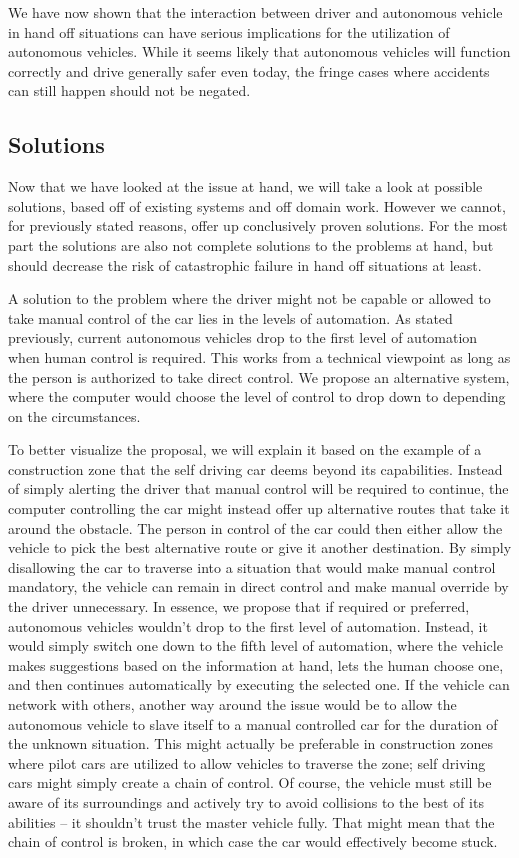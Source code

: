 \documentclass{acm_proc_article-sp}
\begin{document}
We have now shown that the interaction between driver and autonomous vehicle in hand off situations can have serious implications for the utilization of autonomous vehicles.
While it seems likely that autonomous vehicles will function correctly and drive generally safer even today, the fringe cases where accidents can still happen should not be negated.

\subsection{Solutions}
\label{solutions}

Now that we have looked at the issue at hand, we will take a look at possible solutions, based off of existing systems and off domain work.
However we cannot, for previously stated reasons, offer up conclusively proven solutions.
For the most part the solutions are also not complete solutions to the problems at hand, but should decrease the risk of catastrophic failure in hand off situations at least.

A solution to the problem where the driver might not be capable or allowed to take manual control of the car lies in the levels of automation.
As stated previously, current autonomous vehicles drop to the first level of automation when human control is required.
This works from a technical viewpoint as long as the person is authorized to take direct control.
We propose an alternative system, where the computer would choose the level of control to drop down to depending on the circumstances.

To better visualize the proposal, we will explain it based on the example of a construction zone that the self driving car deems beyond its capabilities.
Instead of simply alerting the driver that manual control will be required to continue, the computer controlling the car might instead offer up alternative routes that take it around the obstacle.
The person in control of the car could then either allow the vehicle to pick the best alternative route or give it another destination.
By simply disallowing the car to traverse into a situation that would make manual control mandatory, the vehicle can remain in direct control and make manual override by the driver unnecessary.
In essence, we propose that if required or preferred, autonomous vehicles wouldn't drop to the first level of automation.
Instead, it would simply switch one down to the fifth level of automation, where the vehicle makes suggestions based on the information at hand, lets the human choose one, and then continues automatically by executing the selected one.
If the vehicle can network with others, another way around the issue would be to allow the autonomous vehicle to slave itself to a manual controlled car for the duration of the unknown situation.
This might actually be preferable in construction zones where pilot cars are utilized to allow vehicles to traverse the zone; self driving cars might simply create a chain of control.
Of course, the vehicle must still be aware of its surroundings and actively try to avoid collisions to the best of its abilities – it shouldn't trust the master vehicle fully.
That might mean that the chain of control is broken, in which case the car would effectively become stuck.
\end{document}
